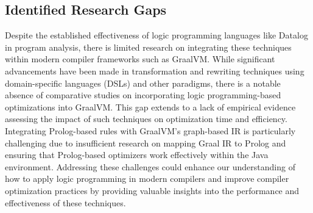 \subsection{Identified Research Gaps}
Despite the established effectiveness of logic programming languages like Datalog in program analysis, there is limited research on integrating these techniques within modern compiler frameworks such as GraalVM. While significant advancements have been made in transformation and rewriting techniques using domain-specific languages (DSLs) and other paradigms, there is a notable absence of comparative studies on incorporating logic programming-based optimizations into GraalVM. This gap extends to a lack of empirical evidence assessing the impact of such techniques on optimization time and efficiency. Integrating Prolog-based rules with GraalVM’s graph-based IR is particularly challenging due to insufficient research on mapping Graal IR to Prolog and ensuring that Prolog-based optimizers work effectively within the Java environment. Addressing these challenges could enhance our understanding of how to apply logic programming in modern compilers and improve compiler optimization practices by providing valuable insights into the performance and effectiveness of these techniques.
